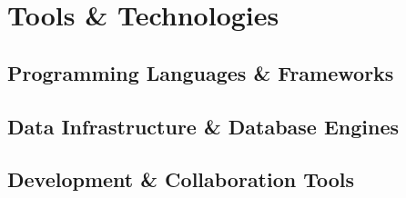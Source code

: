 \chapter{Tools \& Technologies}
\label{chap:tools_technologies}

\section{Programming Languages \& Frameworks}

\section{Data Infrastructure \& Database Engines}

\section{Development \& Collaboration Tools}

